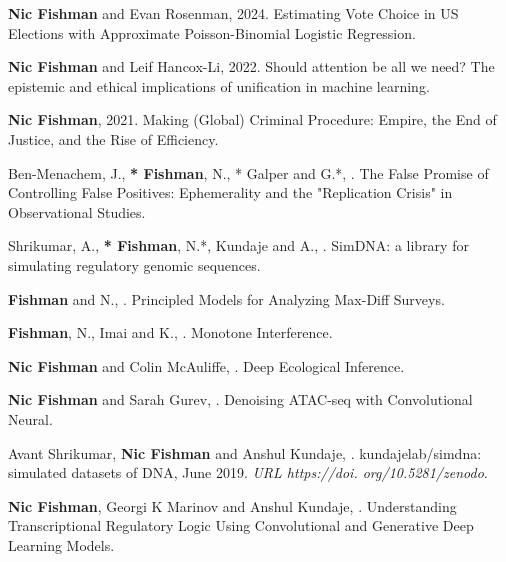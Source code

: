 \begin{cvparagraph}
\begin{addmargin}[2em]{0em}
\end{addmargin}


\begin{addmargin}[2em]{0em}

\textbf{Nic Fishman} and Evan Rosenman, 2024. Estimating Vote Choice in US Elections with Approximate Poisson-Binomial Logistic Regression.

\textbf{Nic Fishman} and Leif Hancox-Li, 2022. Should attention be all we need? The epistemic and ethical implications of unification in machine learning.

\textbf{Nic Fishman}, 2021. Making (Global) Criminal Procedure: Empire, the End of Justice, and the Rise of Efficiency.

Ben-Menachem, J., \textbf{* Fishman}, N., * Galper and G.*, . The False Promise of Controlling False Positives: Ephemerality and the "Replication Crisis" in Observational Studies.

Shrikumar, A., \textbf{* Fishman}, N.*, Kundaje and A., . SimDNA: a library for simulating regulatory genomic sequences.

\textbf{Fishman} and N., . Principled Models for Analyzing Max-Diff Surveys.

\textbf{Fishman}, N., Imai and K., . Monotone Interference.

\textbf{Nic Fishman} and Colin McAuliffe, . Deep Ecological Inference.

\textbf{Nic Fishman} and Sarah Gurev, . Denoising ATAC-seq with Convolutional Neural.

Avant Shrikumar, \textbf{Nic Fishman} and Anshul Kundaje, . kundajelab/simdna: simulated datasets of DNA, June 2019. \textit{URL https://doi. org/10.5281/zenodo}.

\textbf{Nic Fishman}, Georgi K Marinov and Anshul Kundaje, . Understanding Transcriptional Regulatory Logic Using Convolutional and Generative Deep Learning Models.

\end{addmargin}

\end{cvparagraph}
